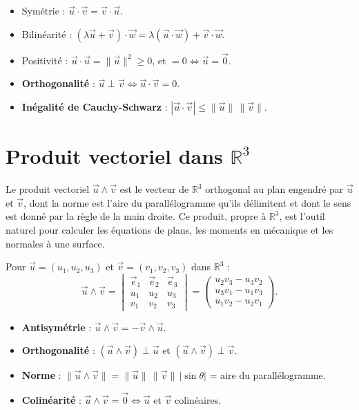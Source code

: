 \documentclass[11pt,a4paper,twoside]{book}
\newcommand{\R}{\mathbb{R}}
\begin{document}
\begin{theoremebox}
\begin{itemize}
  \item Symétrie : $\vec{u}\cdot\vec{v}=\vec{v}\cdot\vec{u}$.
  \item Bilinéarité : $(\lambda\vec{u}+\vec{v})\cdot\vec{w}=\lambda(\vec{u}\cdot\vec{w})+\vec{v}\cdot\vec{w}$.
  \item Positivité : $\vec{u}\cdot\vec{u}=\|\vec{u}\|^2\geq0$, et $=0\iff\vec{u}=\vec{0}$.
  \item \textbf{Orthogonalité} : $\vec{u}\perp\vec{v}\iff\vec{u}\cdot\vec{v}=0$.
  \item \textbf{Inégalité de Cauchy-Schwarz} : $|\vec{u}\cdot\vec{v}|\leq\|\vec{u}\|\,\|\vec{v}\|$.
\end{itemize}
\end{theoremebox}

\section{Produit vectoriel dans $\R^3$}

Le produit vectoriel $\vec{u} \wedge \vec{v}$ est le vecteur de $\mathbb{R}^3$ orthogonal au plan engendré par $\vec{u}$ et $\vec{v}$, dont la norme est l'aire du parallélogramme qu'ils délimitent et dont le sens est donné par la règle de la main droite. Ce produit, propre à $\mathbb{R}^3$, est l'outil naturel pour calculer les équations de plans, les moments en mécanique et les normales à une surface.

\begin{definitionbox}
Pour $\vec{u}=(u_1,u_2,u_3)$ et $\vec{v}=(v_1,v_2,v_3)$ dans $\R^3$ :
\[
  \vec{u}\wedge\vec{v} = \begin{vmatrix}\vec{e}_1&\vec{e}_2&\vec{e}_3\\u_1&u_2&u_3\\v_1&v_2&v_3\end{vmatrix}
  = \begin{pmatrix}u_2v_3-u_3v_2\\u_3v_1-u_1v_3\\u_1v_2-u_2v_1\end{pmatrix}.
\]
\end{definitionbox}

\begin{theoremebox}
\begin{itemize}
  \item \textbf{Antisymétrie} : $\vec{u}\wedge\vec{v} = -\vec{v}\wedge\vec{u}$.
  \item \textbf{Orthogonalité} : $(\vec{u}\wedge\vec{v})\perp\vec{u}$ et $(\vec{u}\wedge\vec{v})\perp\vec{v}$.
  \item \textbf{Norme} : $\|\vec{u}\wedge\vec{v}\| = \|\vec{u}\|\,\|\vec{v}\|\,|\sin\theta|$ = aire du parallélogramme.
  \item \textbf{Colinéarité} : $\vec{u}\wedge\vec{v}=\vec{0}\iff\vec{u}$ et $\vec{v}$ colinéaires.
\end{itemize}
\end{theoremebox}
\end{document}

